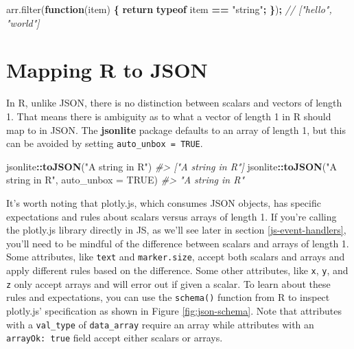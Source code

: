 \documentclass[
  12pt,
]{krantz}
\newenvironment{Shaded}{\begin{snugshade}}{\end{snugshade}}
\newcommand{\AttributeTok}[1]{\textcolor[rgb]{0.77,0.63,0.00}{#1}}
\newcommand{\CommentTok}[1]{\textcolor[rgb]{0.56,0.35,0.01}{\textit{#1}}}
\newcommand{\ControlFlowTok}[1]{\textcolor[rgb]{0.13,0.29,0.53}{\textbf{#1}}}
\newcommand{\DataTypeTok}[1]{\textcolor[rgb]{0.13,0.29,0.53}{#1}}
\newcommand{\KeywordTok}[1]{\textcolor[rgb]{0.13,0.29,0.53}{\textbf{#1}}}
\newcommand{\NormalTok}[1]{#1}
\newcommand{\OperatorTok}[1]{\textcolor[rgb]{0.81,0.36,0.00}{\textbf{#1}}}
\newcommand{\OtherTok}[1]{\textcolor[rgb]{0.56,0.35,0.01}{#1}}
\newcommand{\StringTok}[1]{\textcolor[rgb]{0.31,0.60,0.02}{#1}}
\newcommand{\VariableTok}[1]{\textcolor[rgb]{0.00,0.00,0.00}{#1}}
\begin{document}
\begin{Shaded}
\begin{Highlighting}[]
\VariableTok{arr}\NormalTok{.}\AttributeTok{filter}\NormalTok{(}\KeywordTok{function}\NormalTok{(item) }\OperatorTok{\{} \ControlFlowTok{return} \KeywordTok{typeof}\NormalTok{ item }\OperatorTok{==} \StringTok{"string"}\OperatorTok{;} \OperatorTok{\}}\NormalTok{)}\OperatorTok{;}
\CommentTok{// ["hello", "world"]}
\end{Highlighting}
\end{Shaded}

\hypertarget{mapping-r-to-json}{%
\section{Mapping R to JSON}\label{mapping-r-to-json}}

In R, unlike JSON, there is no distinction between scalars and vectors of length 1. That means there is ambiguity as to what a vector of length 1 in R should map to in JSON. The \textbf{jsonlite} package defaults to an array of length 1, but this can be avoided by setting \texttt{auto\_unbox\ =\ TRUE}.

\begin{Shaded}
\begin{Highlighting}[]
\NormalTok{jsonlite}\OperatorTok{::}\KeywordTok{toJSON}\NormalTok{(}\StringTok{"A string in R"}\NormalTok{)}
\CommentTok{#> ["A string in R"]}
\NormalTok{jsonlite}\OperatorTok{::}\KeywordTok{toJSON}\NormalTok{(}\StringTok{"A string in R"}\NormalTok{, }\DataTypeTok{auto_unbox =} \OtherTok{TRUE}\NormalTok{)}
\CommentTok{#> "A string in R"}
\end{Highlighting}
\end{Shaded}

It's worth noting that plotly.js, which consumes JSON objects, has specific expectations and rules about scalars versus arrays of length 1. If you're calling the plotly.js library directly in JS, as we'll see later in section \ref{js-event-handlers}, you'll need to be mindful of the difference between scalars and arrays of length 1. Some attributes, like \texttt{text} and \texttt{marker.size}, accept both scalars and arrays and apply different rules based on the difference. Some other attributes, like \texttt{x}, \texttt{y}, and \texttt{z} only accept arrays and will error out if given a scalar. To learn about these rules and expectations, you can use the \texttt{schema()} function from R to inspect plotly.js' specification as shown in Figure \ref{fig:json-schema}. Note that attributes with a \texttt{val\_type} of \texttt{\textquotesingle{}data\_array\textquotesingle{}} require an array while attributes with an \texttt{arrayOk:\ true} field accept either scalars or arrays.
\end{document}

